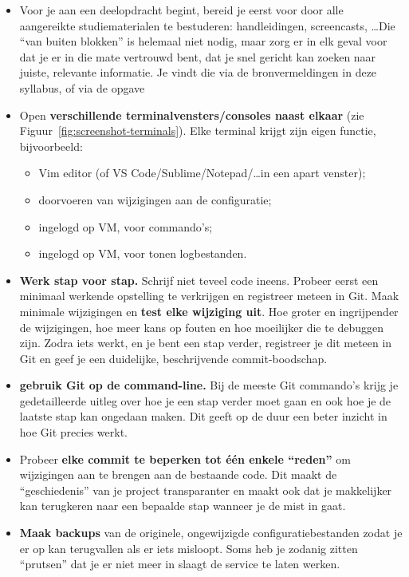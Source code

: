 \begin{itemize}
  \item Voor je aan een deelopdracht begint, bereid je eerst voor door alle aangereikte studiematerialen te bestuderen: handleidingen, screencasts, \ldots Die ``van buiten blokken'' is helemaal niet nodig, maar zorg er in elk geval voor dat je er in die mate vertrouwd bent, dat je snel gericht kan zoeken naar juiste, relevante informatie. Je vindt die via de bronvermeldingen in deze syllabus, of via de opgave
  \item Open \textbf{verschillende terminalvensters/consoles naast elkaar} (zie Figuur~\ref{fig:screenshot-terminals}). Elke terminal krijgt zijn eigen functie, bijvoorbeeld:
    \begin{itemize}
      \item Vim editor (of VS Code/Sublime/Notepad/\ldots in een apart venster);
      \item doorvoeren van wijzigingen aan de configuratie;
      \item ingelogd op VM, voor commando's;
      \item ingelogd op VM, voor tonen logbestanden.
    \end{itemize}
  \item \textbf{Werk stap voor stap.} Schrijf niet teveel code ineens. Probeer eerst een minimaal werkende opstelling te verkrijgen en registreer meteen in Git. Maak minimale wijzigingen en \textbf{test elke wijziging uit}. Hoe groter en ingrijpender de wijzigingen, hoe meer kans op fouten en hoe moeilijker die te debuggen zijn. Zodra iets werkt, en je bent een stap verder, registreer je dit meteen in Git en geef je een duidelijke, beschrijvende commit-boodschap.
  \item \textbf{gebruik Git op de command-line.} Bij de meeste Git commando's krijg je gedetailleerde uitleg over hoe je een stap verder moet gaan en ook hoe je de laatste stap kan ongedaan maken. Dit geeft op de duur een beter inzicht in hoe Git precies werkt.
  \item Probeer \textbf{elke commit te beperken tot één enkele ``reden''} om wijzigingen aan te brengen aan de bestaande code. Dit maakt de ``geschiedenis'' van je project transparanter en maakt ook dat je makkelijker kan terugkeren naar een bepaalde stap wanneer je de mist in gaat.
  \item \textbf{Maak backups} van de originele, ongewijzigde configuratiebestanden zodat je er op kan terugvallen als er iets misloopt. Soms heb je zodanig zitten ``prutsen'' dat je er niet meer in slaagt de service te laten werken.

\end{itemize}
